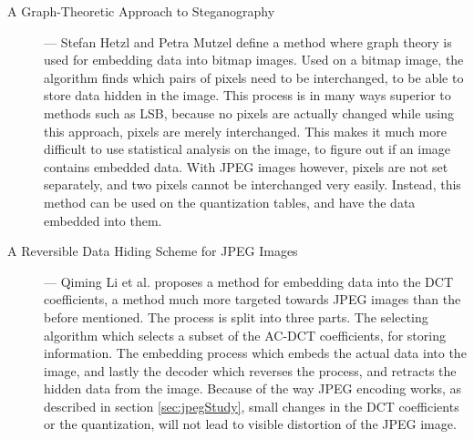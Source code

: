 \begin{description}
	\item[A Graph-Theoretic Approach to Steganography] ---
	Stefan Hetzl and Petra Mutzel define a method where graph theory is used for embedding data into bitmap images\citep{hetzl_2005}. 
	Used on a bitmap image, the algorithm finds which pairs of pixels need to be interchanged, to be able to store data hidden in the image. 
	This process is in many ways superior to methods such as LSB, because no pixels are actually changed while using this approach, pixels are merely interchanged.
	This makes it much more difficult to use statistical analysis on the image, to figure out if an image contains embedded data. 
	With JPEG images however, pixels are not set separately, and two pixels cannot be interchanged very easily. 
	Instead, this method can be used on the quantization tables, and have the data embedded into them.

	\item[A Reversible Data Hiding Scheme for JPEG Images] ---		
	Qiming Li et al. proposes a method for embedding data into the DCT coefficients\citep{Li2010}, a method much more targeted towards JPEG images than the before mentioned.
	The process is split into three parts. The selecting algorithm which selects a subset of the AC-DCT coefficients, for storing information. 
	The embedding process which embeds the actual data into the image, and lastly the decoder which reverses the process, and retracts the hidden data from the image. 
	Because of the way JPEG encoding works, as described in section \ref{sec:jpegStudy}, small changes in the DCT coefficients or the quantization, will not lead to visible distortion of the JPEG image.
\end{description}